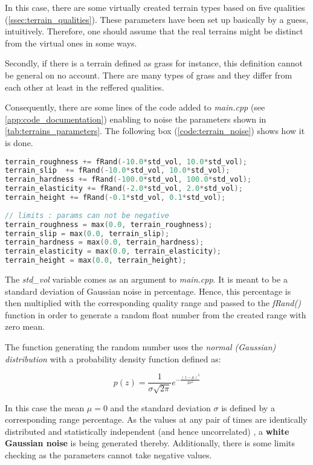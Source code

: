 In this case, there are some virtually created terrain types based on five qualities (\cref{ssec:terrain_qualities}). These parameters have been set up basically by a guess, intuitively. Therefore, one should assume that the real terrains might be distinct from the virtual ones in some ways.

Secondly, if there is a terrain defined as grass for instance, this definition cannot be general on no account. There are many types of grass and they differ from each other at least in the reffered qualities.

Consequently, there are some lines of the code added to \textit{main.cpp} (see \ref{app:code_documentation}) enabling to noise the parameters shown in \cref{tab:terrains_parameters}. The following box (\ref{code:terrain_noise}) shows how it is done. 

\begin{lstlisting}[language=C++, caption={Adding terrain noise in main.cpp}, label=code:terrain_noise]
terrain_roughness += fRand(-10.0*std_vol, 10.0*std_vol);
terrain_slip  += fRand(-10.0*std_vol, 10.0*std_vol);
terrain_hardness += fRand(-100.0*std_vol, 100.0*std_vol);
terrain_elasticity += fRand(-2.0*std_vol, 2.0*std_vol);
terrain_height += fRand(-0.1*std_vol, 0.1*std_vol);
    
// limits : params can not be negative
terrain_roughness = max(0.0, terrain_roughness);
terrain_slip = max(0.0, terrain_slip);
terrain_hardness = max(0.0, terrain_hardness);
terrain_elasticity = max(0.0, terrain_elasticity);
terrain_height = max(0.0, terrain_height);
\end{lstlisting}

The \textit{std\_vol} variable comes as an argument to \textit{main.cpp}. It is meant to be a standard deviation of Gaussian noise in percentage. Hence, this percentage is then multiplied with the corresponding quality range and passed to the \textit{fRand()} function in order to generate a random float number from the created range with zero mean.

The function generating the random number uses the \textit{normal (Gaussian) distribution} with a probability density function defined as:

\begin{equation} \label{eq:gaussian_distribution}
p(z) = \frac{1}{\sigma \sqrt{2 \pi}} e^{- \frac{(z-\mu)^2}{2 \sigma^2}}
\end{equation}

In this case the mean $ \mu = 0 $ and the standard deviation $ \sigma $ is defined by a corresponding range percentage. As the values at any pair of times are identically distributed and statistically independent (and hence uncorrelated) \citep{misc:wiki}, a \textbf{white Gaussian noise} is being generated thereby. Additionally, there is some limits checking as the parameters cannot take negative values.

